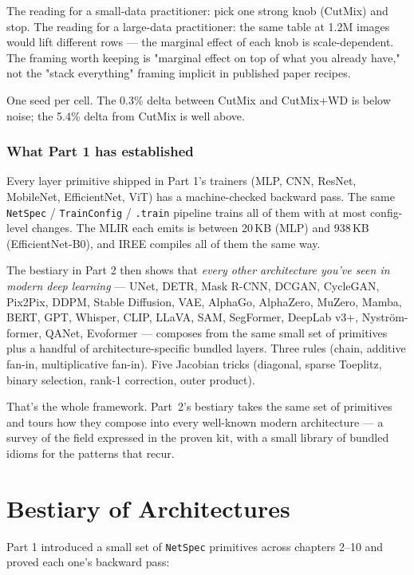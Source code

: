 The reading for a small-data practitioner: pick one strong knob
(CutMix) and stop. The reading for a large-data practitioner: the
same table at 1.2M images would lift different rows --- the
marginal effect of each knob is scale-dependent. The framing
worth keeping is "marginal effect on top of what you already
have," not the "stack everything" framing implicit in published
paper recipes.

One seed per cell. The 0.3\% delta between CutMix and
CutMix+WD is below noise; the 5.4\% delta from CutMix is
well above.

\subsection*{What Part 1 has established}

Every layer primitive shipped in Part 1's trainers (MLP,
CNN, ResNet, MobileNet, EfficientNet, ViT) has a machine-checked
backward pass. The same \texttt{NetSpec} / \texttt{TrainConfig} /
\texttt{.train} pipeline trains all of them with at most
config-level changes. The MLIR each emits is between 20\,KB (MLP)
and 938\,KB (EfficientNet-B0), and IREE compiles all of them the
same way.

The bestiary in Part 2 then shows that \emph{every other
architecture you've seen in modern deep learning} --- UNet, DETR,
Mask R-CNN, DCGAN, CycleGAN, Pix2Pix, DDPM, Stable Diffusion, VAE,
AlphaGo, AlphaZero, MuZero, Mamba, BERT, GPT, Whisper, CLIP, LLaVA,
SAM, SegFormer, DeepLab v3+, Nyström-former, QANet, Evoformer ---
composes from the same small set of primitives plus a handful of
architecture-specific bundled layers. Three rules (chain, additive
fan-in, multiplicative fan-in). Five Jacobian tricks (diagonal,
sparse Toeplitz, binary selection, rank-1 correction, outer
product).

That's the whole framework. Part~2's bestiary takes the same set
of primitives and tours how they compose into every well-known
modern architecture --- a survey of the field expressed in the
proven kit, with a small library of bundled idioms for the patterns
that recur.

\chapter{Bestiary of Architectures}
\label{chap:bestiary}

Part 1 introduced a small set of \texttt{NetSpec} primitives across
chapters 2--10 and proved each one's backward pass:

